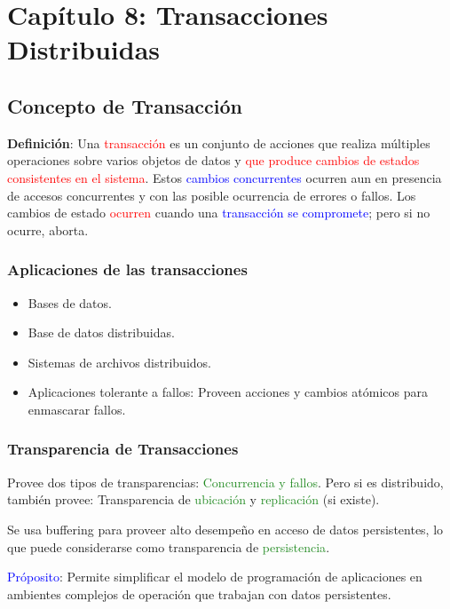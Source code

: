 \section{Capítulo 8: Transacciones Distribuidas}
\subsection{Concepto de Transacción}

\textbf{Definición}: Una \textcolor{red}{transacción} es un conjunto de acciones que realiza múltiples operaciones sobre varios objetos de datos y \textcolor{red}{que produce cambios de estados consistentes en el sistema}. Estos \textcolor{blue}{cambios concurrentes} ocurren aun en presencia de accesos concurrentes y con las posible ocurrencia de errores o fallos. Los cambios de estado \textcolor{red}{ocurren} cuando una \textcolor{blue}{transacción se compromete}; pero si no ocurre, aborta.

\subsubsection{Aplicaciones de las transacciones}
\begin{itemize}
    \item Bases de datos.
    \item Base de datos distribuidas.
    \item Sistemas de archivos distribuidos.
    \item Aplicaciones tolerante a fallos: Proveen acciones y cambios atómicos para enmascarar fallos.
\end{itemize}

\subsubsection{Transparencia de Transacciones}
Provee dos tipos de transparencias: \textcolor{ForestGreen}{Concurrencia y fallos}. Pero si es distribuido, también provee: Transparencia de \textcolor{ForestGreen}{ubicación} y \textcolor{ForestGreen}{replicación} (si existe).

Se usa buffering para proveer alto desempeño en acceso de datos persistentes, lo que puede considerarse como transparencia de \textcolor{ForestGreen}{persistencia}. 

\textcolor{blue}{Próposito}: Permite simplificar el modelo de programación de aplicaciones en ambientes complejos de operación que trabajan con datos persistentes.

